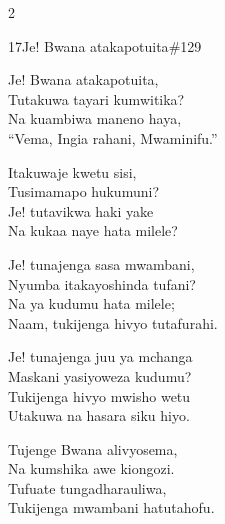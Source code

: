 \begin{multicols}{2}
\begin{hymn}{17}{Je! Bwana atakapotuita}{\#129}
\begin{stanza}
Je! Bwana atakapotuita,\\
Tutakuwa tayari kumwitika?\\
Na kuambiwa maneno haya,\\
``Vema, Ingia rahani, Mwaminifu.''
\end{stanza}
\begin{chorus}
Itakuwaje kwetu sisi,\\
Tusimamapo hukumuni?\\
Je! tutavikwa haki yake\\
Na kukaa naye hata milele?
\end{chorus}
\begin{stanza}
Je! tunajenga sasa mwambani,\\
Nyumba itakayoshinda tufani?\\
Na ya kudumu hata milele;\\
Naam, tukijenga hivyo tutafurahi.
\end{stanza}
\begin{stanza}
Je! tunajenga juu ya mchanga\\
Maskani yasiyoweza kudumu?\\
Tukijenga hivyo mwisho wetu\\
Utakuwa na hasara siku hiyo.
\end{stanza}
\begin{stanza}
Tujenge Bwana alivyosema,\\
Na kumshika awe kiongozi.\\
Tufuate tungadharauliwa,\\
Tukijenga mwambani hatutahofu.
\end{stanza}
\end{hymn}


\end{multicols}
